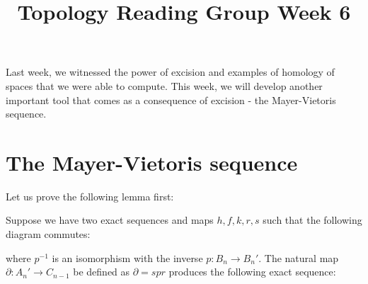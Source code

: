 \documentclass[12pt,reqno]{amsart}
\numberwithin{theorem}{section}
\theoremstyle{definition}
\theoremstyle{remark}
\numberwithin{equation}{section}
\newcommand{\del}{\partial}
\theoremstyle{definition}
\begin{document}
\title{Topology Reading Group Week 6}
\maketitle
Last week, we witnessed the power of excision and examples of homology of spaces that we were able to compute. This week, we will 
develop another important tool that comes as a consequence of excision - the Mayer-Vietoris sequence. 
\section{The Mayer-Vietoris sequence}
Let us prove the following lemma first:
\begin{lemma}\label{exact}
    Suppose we have two exact sequences and maps $h,f,k,r,s$ such that the following diagram commutes:
    \begin{center}
    \end{center}
    where $p^{-1}$ is an isomorphism with the inverse $p:B_{n}\rightarrow B_n'$. The natural map $\del :A_n' \rightarrow C_{n-1}$ be defined as $\del = spr$ produces the following exact sequence:
    \begin{center}
    \end{center}
\end{lemma}
\end{document}
